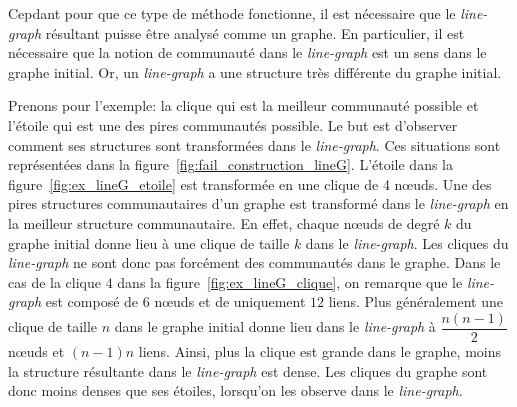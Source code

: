 Cepdant pour que ce type de méthode fonctionne, il est nécessaire que le \emph{line-graph} résultant puisse être analysé comme un graphe.
En particulier, il est nécessaire que la notion de communauté dans le \emph{line-graph} est un sens dans le graphe initial.
Or, un \emph{line-graph} a une structure très différente du graphe initial.


Prenons pour l'exemple: la clique qui est la meilleur communauté possible et l'étoile qui est une des pires communautés possible.
Le but est d'observer comment ses structures sont transformées dans le \emph{line-graph}.
Ces situations sont représentées dans la figure~\ref{fig:fail_construction_lineG}.
L'étoile dans la figure~\ref{fig:ex_lineG_etoile} est transformée en une clique de 4 n\oe uds.
Une des pires structures communautaires d'un graphe est transformé dans le \emph{line-graph} en la meilleur structure communautaire.
En effet, chaque n\oe uds de degré $k$ du graphe initial donne lieu à une clique de taille $k$ dans le \emph{line-graph}.
Les cliques du \emph{line-graph} ne sont donc pas forcément des communautés dans le graphe.
Dans le cas de la clique $4$ dans la figure~\ref{fig:ex_lineG_clique}, on remarque que le \emph{line-graph} est composé de $6$ n\oe uds et de uniquement $12$ liens.
Plus généralement une clique de taille $n$ dans le graphe initial donne lieu dans le \emph{line-graph} à $\dfrac{n(n-1)}{2}$ n\oe uds et $(n-1)n$ liens.
Ainsi, plus la clique est grande dans le graphe, moins la structure résultante dans le \emph{line-graph} est dense.
Les cliques du graphe sont donc moins denses que ses étoiles, lorsqu'on les observe dans le \emph{line-graph}.

